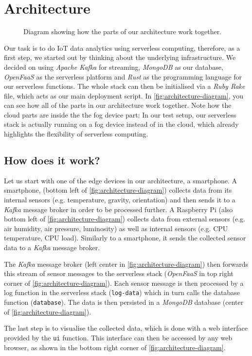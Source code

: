 \chapter{Architecture}
\label{sec:architecture}

\begin{figure}[H]
  \caption{Diagram showing how the parts of our architecture work together.
    \nocite{smartphone-icon, browser-icon}
  }
  \label{fig:architecture-diagram}
\end{figure}

Our task is to do IoT data analytics using serverless computing, therefore, as a first step, we
started out by thinking about the underlying infrastructure. We decided on using \textit{Apache
Kafka} for streaming, \textit{MongoDB} as our database, \textit{OpenFaaS} as the serverless platform
and \textit{Rust} as the programming language for our serverless functions. The whole stack can then
be initialised via a \textit{Ruby Rake} file, which acts as our main deployment script. In
\autoref{fig:architecture-diagram}, you can see how all of the parts in our architecture work
together. Note how the cloud parts are inside the the fog device part: In our test setup, our
serverless stack is actually running on a fog device instead of in the cloud, which already
highlights the flexibility of serverless computing.

\section{How does it work?}

Let us start with one of the edge devices in our architecture, a smartphone. A smartphone, (bottom
left of \autoref{fig:architecture-diagram}) collects data from its internal sensors (e.g.
temperature, gravity, orientation) and then sends it to a \textit{Kafka} message broker in order to
be processed further. A Raspberry Pi (also bottom left of \autoref{fig:architecture-diagram})
collects data from external sensors (e.g. air humidity, air pressure, luminosity) as well as
internal sensors (e.g. CPU temperature, CPU load). Similarly to a smartphone, it sends the collected
sensor data to a \textit{Kafka} message broker.

The \textit{Kafka} message broker (left center in \autoref{fig:architecture-diagram}) then forwards
this stream of sensor messages to the serverless stack (\textit{OpenFaaS} in top right corner of
\autoref{fig:architecture-diagram}). Each sensor message is then processed by a log function in the
serverless stack (\texttt{log-data}) which in turn calls the database function (\texttt{database}).
The data is then persisted in a \textit{MongoDB} database (center of
\autoref{fig:architecture-diagram}).

The last step is to visualise the collected data, which is done with a web interface provided by the
\texttt{ui} function. This interface can then be accessed by any web browser, as shown in the bottom
right corner of \autoref{fig:architecture-diagram}.
